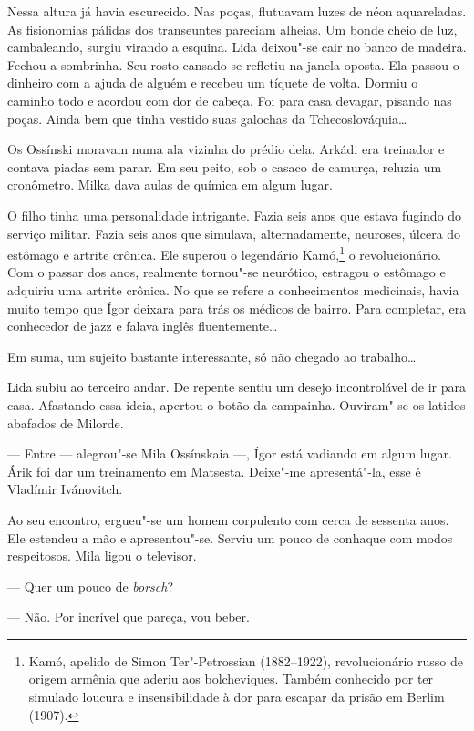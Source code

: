 \bigskip

Nessa altura já havia escurecido. Nas poças, flutuavam luzes de néon
aquareladas. As fisionomias pálidas dos transeuntes pareciam alheias. Um
bonde cheio de luz, cambaleando, surgiu virando a esquina. Lida
deixou"-se cair no banco de madeira. Fechou a sombrinha. Seu rosto
cansado se refletiu na janela oposta. Ela passou o dinheiro com a ajuda
de alguém e recebeu um tíquete de volta. Dormiu o caminho todo e acordou
com dor de cabeça. Foi para casa devagar, pisando nas poças. Ainda bem
que tinha vestido suas galochas da Tchecoslováquia\ldots{}

Os Ossínski moravam numa ala vizinha do prédio dela. Arkádi era treinador e
contava piadas sem parar. Em seu peito, sob o casaco de camurça, reluzia
um cronômetro. Milka dava aulas de química em algum lugar.

O filho tinha uma personalidade intrigante. Fazia seis anos que estava
fugindo do serviço militar. Fazia seis anos que simulava,
alternadamente, neuroses, úlcera do estômago e artrite crônica. Ele
superou o legendário Kamó,\footnote{Kamó, apelido de Simon
  Ter"-Petrossian (1882--1922), revolucionário russo de origem armênia
  que aderiu aos bolcheviques. Também conhecido por ter simulado loucura
  e insensibilidade à dor para escapar da prisão em Berlim (1907).} o
revolucionário. Com o passar dos anos, realmente tornou"-se neurótico,
estragou o estômago e adquiriu uma artrite crônica. No que se refere a
conhecimentos medicinais, havia muito tempo que Ígor deixara para trás
os médicos de bairro. Para completar, era conhecedor de jazz e falava
inglês fluentemente\ldots{}

Em suma, um sujeito bastante interessante, só não chegado ao trabalho\ldots{}

Lida subiu ao terceiro andar. De repente sentiu um desejo incontrolável
de ir para casa. Afastando essa ideia, apertou o botão da campainha.
Ouviram"-se os latidos abafados de Milorde.

--- Entre --- alegrou"-se Mila Ossínskaia ---, Ígor está vadiando em
algum lugar. Árik foi dar um treinamento em Matsesta. Deixe"-me
apresentá"-la, esse é Vladímir Ivánovitch.

Ao seu encontro, ergueu"-se um homem corpulento com cerca de sessenta
anos. Ele estendeu a mão e apresentou"-se. Serviu um pouco de conhaque
com modos respeitosos. Mila ligou o televisor.

--- Quer um pouco de \emph{borsch}?

--- Não. Por incrível que pareça, vou beber.

